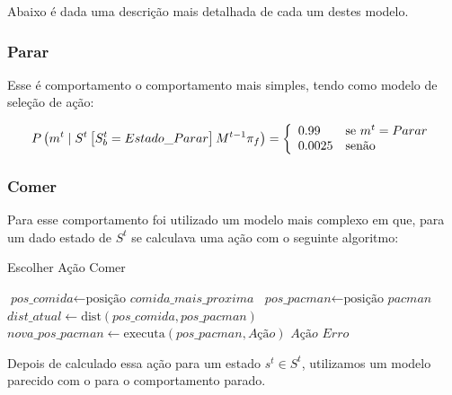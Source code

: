 Abaixo é dada uma descrição mais detalhada de cada um destes modelo.

\subsubsection*{Parar}

Esse é comportamento o comportamento mais simples, tendo como modelo de seleção de ação:

\begin{equation}
    P \left( m^t \mid S^t \left[ S_b^t = Estado\_Parar \right] M^{t-1} \pi_f \right) = 
        \left\{
            \begin{array}{l l}
                0.99 & \text{se }m^t = Parar \\
                0.0025 & \text{senão}
            \end{array}
        \right.
\end{equation}

\subsubsection*{Comer}

Para esse comportamento foi utilizado um modelo mais complexo em que, para um dado estado de $ S^t $ se calculava uma ação com o seguinte algoritmo:

\begin{algorithm}[H]
	\caption{Escolher Ação Comer} \label{algorithm:SelecaoDeAcaoComer}
	\begin{algorithmic}[1]
			\State $\textit{pos\_comida} \gets \text{posição }\textit{comida\_mais\_proxima} $
			\State $\textit{pos\_pacman} \gets \text{posição }\textit{pacman} $
			\State $\textit{dist\_atual} \gets \text{dist} \left( \textit{pos\_comida}, \textit{pos\_pacman} \right) $
				\State $\textit{nova\_pos\_pacman} \gets \text{executa} \left( \textit{pos\_pacman}, \textit{Ação} \right) $
					\State \Return $ \textit{Ação} $
				\EndIf 
			\EndFor
			\State \Return $ \textit{Erro} $
		\EndProcedure
	\end{algorithmic}
\end{algorithm}

Depois de calculado essa ação para um estado $ s^t \in S^t $, utilizamos um modelo parecido com o para o comportamento parado.

